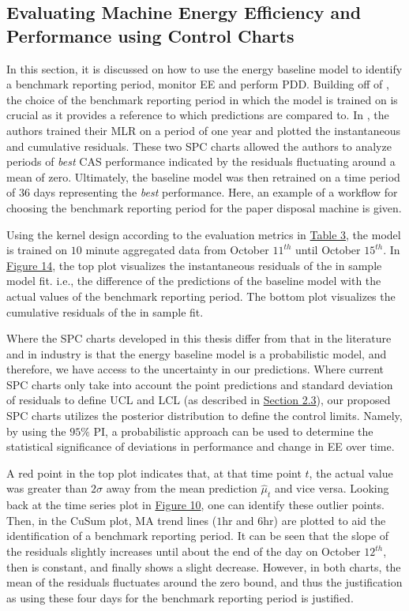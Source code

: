 \subsection{Evaluating Machine Energy Efficiency and Performance using Control Charts}

In this section, it is discussed on how to use the energy baseline model to identify a benchmark reporting period, monitor EE and perform PDD. Building off of \cite{oakland_statistical_2008}, the choice of the benchmark reporting period in which the model is trained on is crucial as it provides a reference to which predictions are compared to. In \cite{cas}, the authors trained their MLR on a period of one year and plotted the instantaneous and cumulative residuals. These two SPC charts allowed the authors to analyze periods of \textit{best} CAS performance indicated by the residuals fluctuating around a mean of zero. Ultimately, the baseline model was then retrained on a time period of $36$ days representing the \textit{best} performance. Here, an example of a workflow for choosing the benchmark reporting period for the paper disposal machine is given.

Using the kernel design according to the evaluation metrics in \hyperlink{table.3}{Table 3}, the model is trained on $10$ minute aggregated data from October $11^{th}$ until October $15^{th}$. In \hyperlink{figure.14}{Figure 14}, the top plot visualizes the instantaneous residuals of the in sample model fit. i.e., the difference of the predictions of the baseline model with the actual values of the benchmark reporting period. The bottom plot visualizes the cumulative residuals of the in sample fit. 

Where the SPC charts developed in this thesis differ from that in the literature and in industry is that the energy baseline model is a probabilistic model, and therefore, we have access to the uncertainty in our predictions. Where current SPC charts only take into account the point predictions and standard deviation of residuals to define UCL and LCL (as described in \hyperlink{subsection.2.3}{Section 2.3}), our proposed SPC charts utilizes the posterior distribution to define the control limits. Namely, by using the $95\%$ PI, a probabilistic approach can be used to determine the statistical significance of deviations in performance and change in EE over time. 

A red point in the top plot indicates that, at that time point $t$, the actual value was greater than $2 \sigma$ away from the mean prediction $\hat{\mu}_t$ and vice versa. Looking back at the time series plot in \hyperlink{figure.10}{Figure 10}, one can identify these outlier points. Then, in the CuSum plot, MA trend lines ($1$hr and $6$hr) are plotted to aid the identification of a benchmark reporting period. It can be seen that the slope of the residuals slightly increases until about the end of the day on October $12^{th}$, then is constant, and finally shows a slight decrease. However, in both charts, the mean of the residuals fluctuates around the zero bound, and thus the justification as using these four days for the benchmark reporting period is justified.

